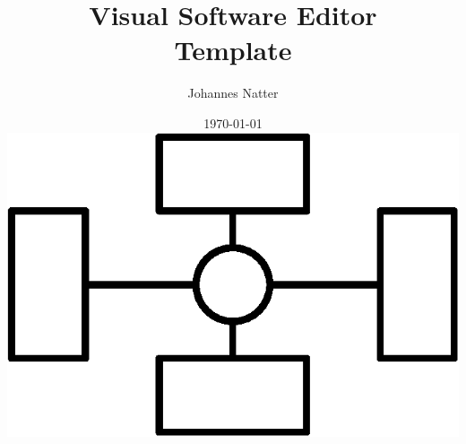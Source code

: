 \documentclass[a4paper,11pt,oneside]{book}
\begin{document}
  \title{\textbf{Visual Software Editor \\ Template}} 
  \author{Johannes Natter}
  \date{\today \\ \vspace{5cm} \includegraphics[width=100 pt]{../_common/logo}}

  \frontmatter
  \maketitle
  
  \tableofcontents
  

  \mainmatter
  
  
  

  \clearpage

  \backmatter

  \printbibliography
\end{document}
